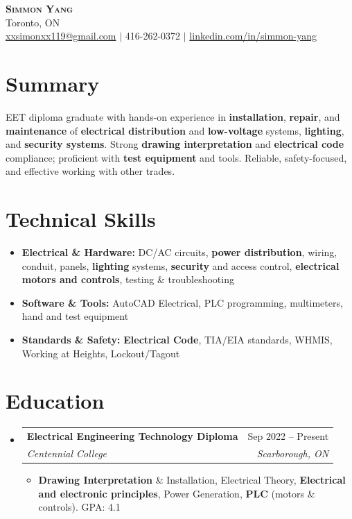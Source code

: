 \documentclass[letterpaper,11pt]{article}
\makeatletter
\newcommand{\resumeItem}[1]{\item\small{{#1 \vspace{-2pt}}}}
\newcommand{\resumeSubheading}[4]{
  \vspace{-4pt}\item
    \begin{tabular*}{0.97\textwidth}[t]{l@{\extracolsep{\fill}}r}
      \textbf{#1} & #2 \\
      \textit{\small #3} & \textit{\small #4} \\
    \end{tabular*}\vspace{-8pt}
}
\newcommand{\resumeSubHeadingListStart}{\begin{itemize}[leftmargin=0.15in, label={}]}
\newcommand{\resumeSubHeadingListEnd}{\end{itemize}}
\newcommand{\resumeItemListStart}{\begin{itemize}}
\newcommand{\resumeItemListEnd}{\end{itemize}\vspace{-5pt}}
\makeatother
\begin{document}
\begin{center}
    \textbf{\Huge \scshape Simmon Yang} \\ \vspace{1pt}
    Toronto, ON \\ 
    \href{mailto:xxsimonxx119@gmail.com}{xxsimonxx119@gmail.com} $|$ 416-262-0372 $|$ 
    \href{https://www.linkedin.com/in/simmon-yang/}{linkedin.com/in/simmon-yang}
\end{center}

\section{Summary}
EET diploma graduate with hands-on experience in \textbf{installation}, \textbf{repair}, and \textbf{maintenance} of \textbf{electrical distribution} and \textbf{low-voltage} systems, \textbf{lighting}, and \textbf{security systems}. Strong \textbf{drawing interpretation} and \textbf{electrical code} compliance; proficient with \textbf{test equipment} and tools. Reliable, safety-focused, and effective working with other trades.

\section{Technical Skills}
\begin{itemize}[leftmargin=0.15in]
  \item \textbf{Electrical \& Hardware:} DC/AC circuits, \textbf{power distribution}, wiring, conduit, panels, \textbf{lighting} systems, \textbf{security} and access control, \textbf{electrical motors and controls}, testing \& troubleshooting
  \item \textbf{Software \& Tools:} AutoCAD Electrical, PLC programming, multimeters, hand and test equipment
  \item \textbf{Standards \& Safety:} \textbf{Electrical Code}, TIA/EIA standards, WHMIS, Working at Heights, Lockout/Tagout
\end{itemize}

\section{Education}
\resumeSubHeadingListStart
\resumeSubheading
  {Electrical Engineering Technology Diploma}{Sep 2022 -- Present}
  {Centennial College}{Scarborough, ON}
\resumeItemListStart
  \resumeItem{\textbf{Drawing Interpretation} \& Installation, Electrical Theory, \textbf{Electrical and electronic principles}, Power Generation, \textbf{PLC} (motors \& controls). GPA: 4.1}
\resumeItemListEnd
\resumeSubHeadingListEnd
\end{document}
